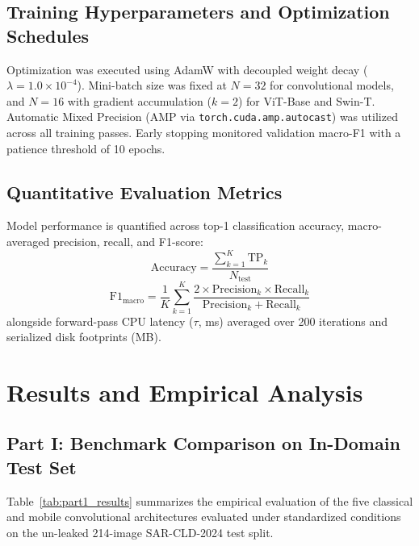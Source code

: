 \documentclass[journal,10pt,twocolumn]{IEEEtran}
\begin{document}
\subsection{Training Hyperparameters and Optimization Schedules}
Optimization was executed using AdamW \cite{loshchilov2018decoupled} with decoupled weight decay ($\lambda = 1.0 \times 10^{-4}$). Mini-batch size was fixed at $N = 32$ for convolutional models, and $N = 16$ with gradient accumulation ($k = 2$) for ViT-Base and Swin-T. Automatic Mixed Precision (AMP via \texttt{torch.cuda.amp.autocast}) was utilized across all training passes. Early stopping monitored validation macro-F1 with a patience threshold of 10 epochs.

\subsection{Quantitative Evaluation Metrics}
Model performance is quantified across top-1 classification accuracy, macro-averaged precision, recall, and F1-score:
\begin{equation}
\text{Accuracy} = \frac{\sum_{k=1}^K \text{TP}_k}{N_{\text{test}}}
\end{equation}
\begin{equation}
\text{F1}_{\text{macro}} = \frac{1}{K} \sum_{k=1}^K \frac{2 \times \text{Precision}_k \times \text{Recall}_k}{\text{Precision}_k + \text{Recall}_k}
\end{equation}
alongside forward-pass CPU latency ($\tau$, ms) averaged over 200 iterations and serialized disk footprints (MB).

\section{Results and Empirical Analysis}

\subsection{Part I: Benchmark Comparison on In-Domain Test Set}
Table~\ref{tab:part1_results} summarizes the empirical evaluation of the five classical and mobile convolutional architectures evaluated under standardized conditions on the un-leaked 214-image SAR-CLD-2024 test split.
\end{document}
